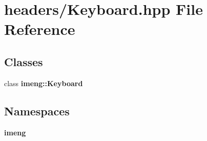\section{headers/\+Keyboard.hpp File Reference}
\label{_keyboard_8hpp}
\subsection*{Classes}
\begin{DoxyCompactItemize}
\item 
class \textbf{ imeng\+::\+Keyboard}
\end{DoxyCompactItemize}
\subsection*{Namespaces}
\begin{DoxyCompactItemize}
\item 
 \textbf{ imeng}
\end{DoxyCompactItemize}
